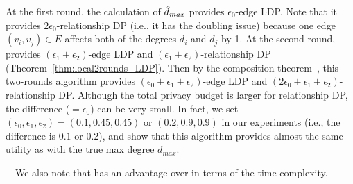 
At the first round, the calculation of $\hat{d}_{max}$ provides $\epsilon_0$-edge LDP. 
Note that it provides $2\epsilon_0$-relationship DP (i.e., it has the doubling issue) because one edge $(v_i,v_j) \in E$ affects both of the degrees $d_i$ and $d_j$ by 1. 
At the second round,  provides $(\epsilon_1 + \epsilon_2)$-edge LDP and 
$(\epsilon_1 + \epsilon_2)$-relationship DP (Theorem~\ref{thm:local2rounds_LDP}). 
Then by the composition theorem~\cite{DP}, this two-rounds algorithm provides $(\epsilon_0 + \epsilon_1 + \epsilon_2)$-edge LDP and $(2\epsilon_0 + \epsilon_1 + \epsilon_2)$-relationship DP. 
Although the total privacy budget is larger for relationship DP, the difference ($=\epsilon_0$) can be very small. 
In fact, we set $(\epsilon_0, \epsilon_1, \epsilon_2) = (0.1, 0.45, 0.45)$ or $(0.2, 0.9, 0.9)$ in our experiments (i.e., the difference is $0.1$ or $0.2$), and show that this algorithm provides almost the same utility as  with the true max degree $d_{max}$. 

\smallskip
{}~~We also note that  has an advantage over  in terms of the time complexity. 

